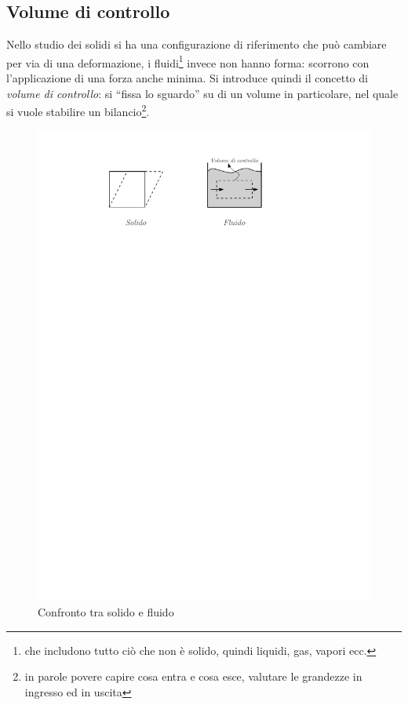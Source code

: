 \subsection{Volume di controllo}
Nello studio dei solidi si ha una configurazione di riferimento che può cambiare per via di una deformazione, i fluidi\footnote{che includono tutto ciò che non è solido, quindi liquidi, gas, vapori ecc.} invece non hanno forma: scorrono con l'applicazione di una forza anche minima.
Si introduce quindi il concetto di \textit{volume di controllo}: si ``fissa lo sguardo'' su di un volume in particolare, nel quale si vuole stabilire un bilancio\footnote{in parole povere capire cosa entra e cosa esce, valutare le grandezze in ingresso ed in uscita}.
	\begin{figure}[H]
		\includegraphics[scale=0.9]{./1.1 Introduzione ai sistemi continui/1.1-1}
		\centering
		\caption{Confronto tra solido e fluido}
	\end{figure}
